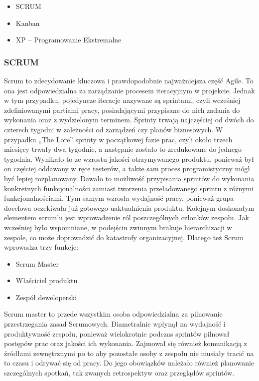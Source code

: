 \documentclass[oneside,polski,logo]{amuthesis}
\begin{document}
\begin{itemize}
	\item SCRUM
	\item Kanban
	\item XP – Programowanie Ekstremalne \\
\end{itemize}

\subsubsection{SCRUM}

Scrum to zdecydowanie kluczowa i prawdopodobnie najważniejsza część Agile. To ona jest odpowiedzialna za zarządzanie procesem iteracyjnym w projekcie. Jednak w tym przypadku, pojedyncze iteracje nazywane są sprintami, czyli wcześniej zdefiniowanymi partiami pracy, posiadającymi przypisane do nich zadania do wykonania oraz z wydzielonym terminem. Sprinty trwają najczęściej od dwóch do czterech tygodni w zależności od zarządzeń czy planów biznesowych. W przypadku „The Lore” sprinty w początkowej fazie prac, czyli około trzech miesięcy trwały dwa tygodnie, a następnie zostało to zredukowane do jednego tygodnia. Wynikało to ze wzrostu jakości otrzymywanego produktu, ponieważ był on częściej oddawany w ręce testerów, a także sam proces programistyczny mógł być lepiej rozplanowany. Dawało to możliwość przypisania sprintów do wykonania konkretnych funkcjonalności zamiast tworzenia przeładowanego sprintu z różnymi funkcjonalnościami. Tym samym wzrosła wydajność pracy, ponieważ grupa docelowa oczekiwała już gotowego uaktualnienia produktu. Kolejnym doskonałym elementem scrum’u jest wprowadzenie ról poszczególnych członków zespołu. Jak wcześniej było wspomniane, w podejściu zwinnym brakuje hierarchizacji w zespole, co może doprowadzić do katastrofy organizacyjnej.\cite{agileHunt} Dlatego też Scrum wprowadza trzy funkcje:

\begin{itemize}
	\item Scrum Master
	\item Właściciel produktu
	\item Zespół deweloperski \\
\end{itemize}

Scrum master to przede wszystkim osoba odpowiedzialna za pilnowanie przestrzegania zasad Scrumowych. Diametralnie wpłynął na wydajność i produktywność zespołu, ponieważ wielokrotnie podczas sprintów pilnował postępów prac oraz jakości ich wykonania. Zajmował się również komunikacją z źródłami zewnętrznymi po to aby pozostałe osoby z zespołu nie musiały tracić na to czasu i odrywać się od pracy. Do jego obowiązków należało również planowanie szczególnych spotkań, tak zwanych retrospektyw oraz przeglądów sprintów. \\
\end{document}
